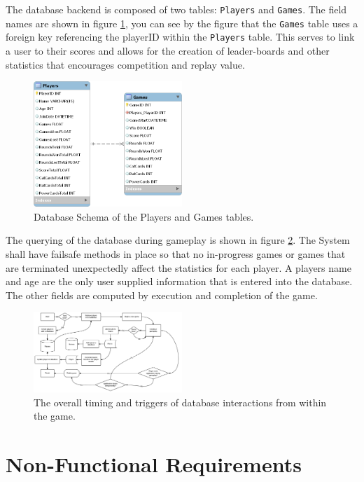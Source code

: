 \documentclass[12pt]{IEEEtran}
\begin{document}
	The database backend is composed of two tables: \texttt{Players} and \texttt{Games}. The field names are shown in 			figure \ref{fig:dbschema}, you can see by the figure that the \texttt{Games} table uses a foreign key referencing the 			playerID within the \texttt{Players} table. This serves to link a user to their scores and allows for the creation of 				leader-boards and other statistics that encourages competition and replay value.
	
	\begin{figure}[ht]
		\includegraphics[width=0.5\textwidth]{DatabaseDiagram.png}
		\caption[Database table design]{ Database Schema of the Players and Games tables.}
		\label{fig:dbschema}
	\end{figure}

	The querying of the database during gameplay is shown in figure \ref{fig:dbflow}. The System shall have failsafe 			methods in place so that no in-progress games or games that are terminated unexpectedly affect the statistics for each 		player. A players name and age are the only user supplied information that is entered into the database. The other 			fields are computed by execution and completion of the game.

	\begin{figure}[b]	
		\centering
		\includegraphics[width=0.5\textwidth]{DatabaseFlowChart.png}
		\caption[Database Query Flow]{ The overall timing and triggers of database interactions from within the game.  }
		\label{fig:dbflow}
	\end{figure}


\section{Non-Functional Requirements}
\label{sec:nonFuncReq}
\end{document}
